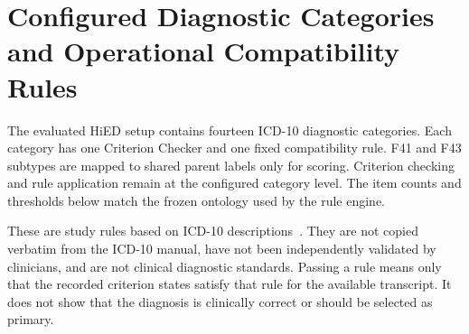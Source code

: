 \appendix
{}

\chapter{Configured Diagnostic Categories and Operational Compatibility Rules}
\label{app:configured-profile}

The evaluated HiED setup contains fourteen ICD-10 diagnostic categories. Each category has one Criterion Checker and one fixed compatibility rule. F41 and F43 subtypes are mapped to shared parent labels only for scoring. Criterion checking and rule application remain at the configured category level. The item counts and thresholds below match the frozen ontology used by the rule engine.

These are study rules based on ICD-10 descriptions~\citep{who2019icd10}. They are not copied verbatim from the ICD-10 manual, have not been independently validated by clinicians, and are not clinical diagnostic standards. Passing a rule means only that the recorded criterion states satisfy that rule for the available transcript. It does not show that the diagnosis is clinically correct or should be selected as primary.

